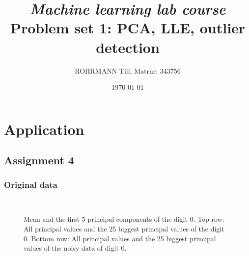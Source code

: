 \documentclass[a4paper, 12pt, titlepage]{article}
\title
{{\em Machine learning lab course}\\
Problem set 1: PCA, LLE, outlier detection}
\author{ROHRMANN Till, Matrnr: 343756}
\date{\today}
\begin{document}
\maketitle

\setcounter{section}{1}
\section{Application}

\subsection*{Assignment 4}

\subsubsection*{Original data}

\begin{figure}[H]
	\centering
	\\
	\caption{\protect{} Mean and the first 5 principal components of the digit 0. \protect{} Top row: All principal values and the 25 biggest principal values of the digit 0. Bottom row: All principal values and the 25 biggest principal values of the noisy data of digit 0.}
\end{figure}
\end{document}
